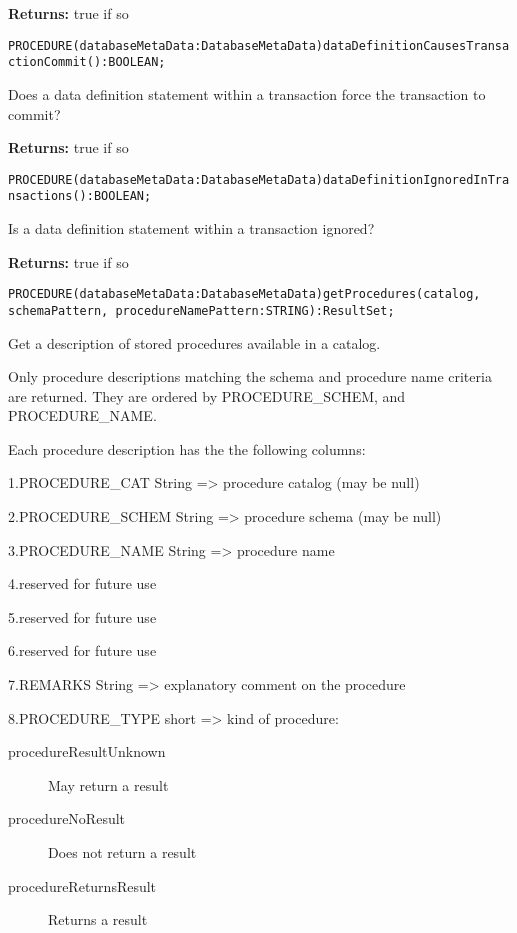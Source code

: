 {\bf Returns: } 
true if so 




\verb'PROCEDURE(databaseMetaData:DatabaseMetaData)dataDefinitionCausesTransactionCommit():BOOLEAN;'






Does a data definition statement within a transaction force the transaction to commit? 


{\bf Returns: } 
true if so 




\verb'PROCEDURE(databaseMetaData:DatabaseMetaData)dataDefinitionIgnoredInTransactions():BOOLEAN;'






Is a data definition statement within a transaction ignored? 


{\bf Returns: } 
true if so 




\verb'PROCEDURE(databaseMetaData:DatabaseMetaData)getProcedures(catalog, schemaPattern, procedureNamePattern:STRING):ResultSet;'




Get a description of stored procedures available in a catalog. 

Only procedure descriptions matching the schema and procedure name criteria are returned. They are ordered by PROCEDURE\_SCHEM, and PROCEDURE\_NAME. 

Each procedure description has the the following columns: 

1.PROCEDURE\_CAT String => procedure catalog (may be null) 

2.PROCEDURE\_SCHEM String => procedure schema (may be null) 

3.PROCEDURE\_NAME String => procedure name 

4.reserved for future use 

5.reserved for future use 

6.reserved for future use 

7.REMARKS String => explanatory comment on the procedure 

8.PROCEDURE\_TYPE short => kind of procedure: 
\begin{description}
\item[procedureResultUnknown] May return a result 
\item[procedureNoResult] Does not return a result 
\item[procedureReturnsResult] Returns a result 
\end{description}



